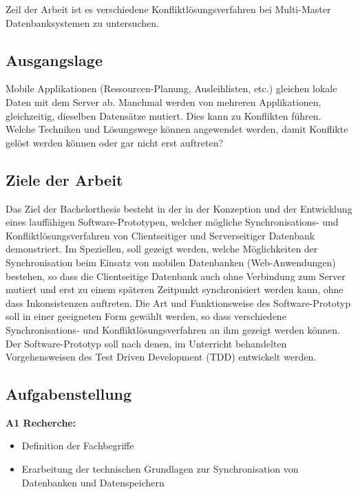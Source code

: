 \documentclass[oneside,11pt,parskip=half,ngerman]{scrreprt}
\begin{document}
Zeil der Arbeit ist es verschiedene Konfliktlösungsverfahren bei
Multi-Master Datenbanksystemen zu untersuchen.

\subsection{Ausgangslage}\label{ausgangslage}

Mobile Applikationen (Ressourcen-Planung, Ausleihlisten, etc.) gleichen
lokale Daten mit dem Server ab. Manchmal werden von mehreren
Applikationen, gleichzeitig, dieselben Datensätze mutiert. Dies kann zu
Konflikten führen. Welche Techniken und Lösungswege können angewendet
werden, damit Konflikte gelöst werden können oder gar nicht erst
auftreten?

\subsection{Ziele der Arbeit}\label{ziele-der-arbeit}

Das Ziel der Bachelorthesis besteht in der in der Konzeption und der
Entwicklung eines lauffähigen Software-Prototypen, welcher mögliche
Synchronisations- und Konfliktlösungsverfahren von Clientseitiger und
Serverseitiger Datenbank demonstriert. Im Speziellen, soll gezeigt
werden, welche Möglichkeiten der Synchronisation beim Einsatz von
mobilen Datenbanken (Web-Anwendungen) bestehen, so dass die
Clientseitige Datenbank auch ohne Verbindung zum Server mutiert und erst
zu einem späteren Zeitpunkt synchronisiert werden kann, ohne dass
Inkonsistenzen auftreten. Die Art und Funktionsweise des
Software-Prototyp soll in einer geeigneten Form gewählt werden, so dass
verschiedene Synchronisations- und Konfliktlösungsverfahren an ihm
gezeigt werden können. Der Software-Prototyp soll nach denen, im
Unterricht behandelten Vorgehensweisen des Test Driven Development (TDD)
entwickelt werden.

\subsection{Aufgabenstellung}\label{aufgabenstellung-1}

\textbf{A1 Recherche:}

\begin{itemize}
\itemsep1pt\parskip0pt
\item
  Definition der Fachbegriffe
\item
  Erarbeitung der technischen Grundlagen zur Synchronisation von
  Datenbanken und Datenspeichern
\end{itemize}
\end{document}
